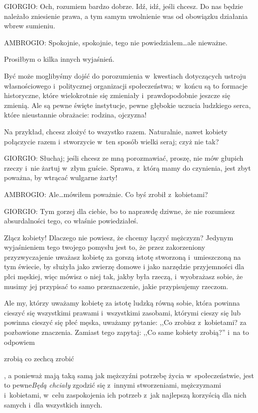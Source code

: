 \documentclass[oneside,polish,11pt,sfheadings]{mwbk}
\begin{document}
 
\noindent GIORGIO: Och, rozumiem bardzo dobrze. Idź, idź, jeśli chcesz. Do nas będzie należało zniesienie prawa, a tym samym
uwolnienie was od obowiązku działania wbrew sumieniu. 




 
\noindent AMBROGIO: Spokojnie, spokojnie, tego nie powiedziałem\ldots ale nieważne. 

 
Prosiłbym o kilka innych wyjaśnień. 

 
Być może moglibyśmy dojść do porozumienia w~kwestiach dotyczących ustroju własnościowego i~politycznej organizacji
społeczeństwa; w~końcu są to formacje historyczne, które wielokrotnie się zmieniały i~prawdopodobnie jeszcze się
zmienią. Ale są pewne święte instytucje, pewne głębokie uczucia ludzkiego serca, które nieustannie obrażacie: rodzina,
ojczyzna! 

 
Na przykład, chcesz złożyć to wszystko razem. Naturalnie, nawet kobiety połączycie razem i~stworzycie w~ten sposób
wielki seraj; czyż nie tak? 




 
\noindent GIORGIO: Słuchaj; jeśli chcesz ze mną porozmawiać, proszę, nie mów głupich rzeczy i~nie żartuj w~złym guście. Sprawa, z~którą mamy do czynienia, jest zbyt poważna, by wtrącać wulgarne żarty! 




 
\noindent AMBROGIO: Ale\ldots  mówiłem poważnie. Co byś zrobił z~kobietami? 




 
\noindent GIORGIO: Tym gorzej dla ciebie, bo to naprawdę dziwne, że nie rozumiesz absurdalności tego, co właśnie powiedziałeś. 

 
Złącz kobiety! Dlaczego nie powiesz, że chcemy łączyć mężczyzn? Jedynym wyjaśnieniem tego twojego pomysłu jest to, że
przez zakorzeniony przyzwyczajenie uważasz kobietę za gorszą istotę stworzoną i~umieszczoną na tym świecie, by służyła
jako zwierzę domowe i jako narzędzie przyjemności dla płci męskiej, więc mówisz o niej tak, jakby była rzeczą, i~wyobrażasz sobie, że musimy jej przypisać to samo przeznaczenie, jakie przypisujemy rzeczom. 

 
Ale my, którzy uważamy kobietę za istotę ludzką równą sobie, która powinna cieszyć się wszystkimi prawami i~wszystkimi
zasobami, którymi cieszy się lub powinna cieszyć się płeć męska, uważamy pytanie: ,,Co zrobisz z~kobietami?{\textquotedbl} za pozbawione znaczenia. Zamiast tego zapytaj: ,,Co same kobiety zrobią?'' i~na to odpowiem
\begin{itshape}zrobią co zechcą zrobić \end{itshape}, a ponieważ mają taką samą jak mężczyźni
potrzebę życia w~społeczeństwie, jest to pewne\textit{Będą chciały} zgodzić się z~innymi stworzeniami,
mężczyznami i~kobietami, w~celu zaspokojenia ich potrzeb z~jak najlepszą korzyścią dla nich samych i~dla wszystkich
innych. 
\end{document}
